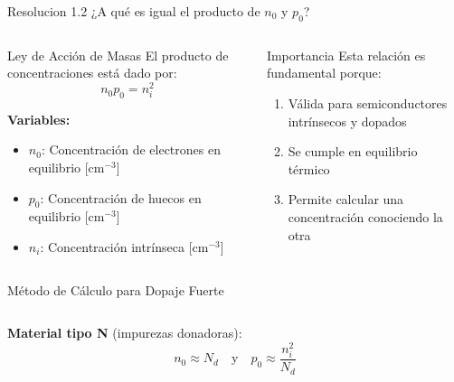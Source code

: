 \documentclass[
    10pt,
    aspectratio=169,
    xcolor={dvipsnames},
    spanish,
    ]{beamer}
\begin{document}
\begin{frame}
  \begin{block}{Resolucion 1.2}
    ¿A qué es igual el producto de $n_0$ y $p_0$?
  \end{block}
  
  \begin{columns}
    \begin{column}{0.48\textwidth}
      \begin{block}{Ley de Acción de Masas}
        \footnotesize
        El producto de concentraciones está dado por:
        \begin{equation}
          n_0 p_0 = n_i^{2}  
        \end{equation}
        
        \textbf{Variables:}
        \begin{itemize}
          \item $n_0$: Concentración de electrones en equilibrio [cm$^{-3}$]
          \item $p_0$: Concentración de huecos en equilibrio [cm$^{-3}$]
          \item $n_i$: Concentración intrínseca [cm$^{-3}$]
        \end{itemize}
      \end{block}
    \end{column}
    
    \begin{column}{0.48\textwidth}
      \begin{block}{Importancia}
        \footnotesize
        Esta relación es fundamental porque:
        \begin{enumerate}
          \item Válida para semiconductores intrínsecos y dopados
          \item Se cumple en equilibrio térmico
          \item Permite calcular una concentración conociendo la otra
        \end{enumerate}
      \end{block}
    \end{column}
  \end{columns}

  \begin{block}{Método de Cálculo para Dopaje Fuerte}
    \footnotesize
    \begin{columns}
      \begin{column}{0.48\textwidth}
        \textbf{Material tipo N} (impurezas donadoras):
        \begin{equation}
          n_0 \approx N_d \quad \text{y} \quad p_0 \approx \frac{n_i^2}{N_d}
        \end{equation}
      \end{column}
      

\end{columns}
\end{block}
\end{frame}
\end{document}
